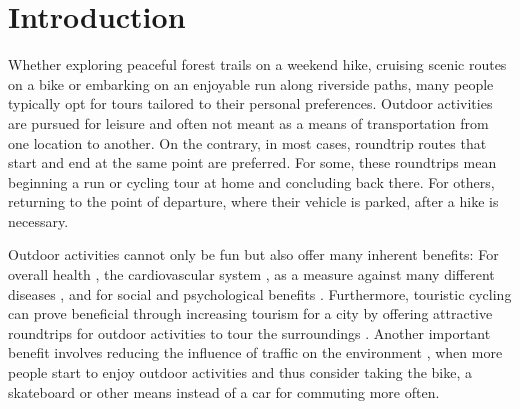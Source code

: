 \chapter{Introduction}
\label{chapter:introduction}



Whether exploring peaceful forest trails on a weekend hike, cruising scenic routes on a bike or embarking on an enjoyable run along riverside paths, many people typically opt for tours tailored to their personal preferences.
Outdoor activities are pursued for leisure and often not meant as a means of transportation from one location to another.
On the contrary, in most cases, roundtrip routes that start and end at the same point are preferred.
For some, these roundtrips mean beginning a run or cycling tour at home and concluding back there. 
For others, returning to the point of departure, where their vehicle is parked, after a hike is necessary.



%

Outdoor activities cannot only be fun but also offer many inherent benefits: 
For overall health \cite{oja_health_2011, ruegsegger_health_2018, vina_exercise_2012}, the cardiovascular system \cite{nystoriak_cardiovascular_2018}, as a measure against many different diseases \cite{oja_health_2011}, and for social \cite{mueller_jogging_2007, obrien_jogging_2007, wankel_psychological_1990} and psychological benefits \cite{biddle_psychological_1993, cekin_psychological_2015, szabo_psychological_2013, wankel_psychological_1990}. 
Furthermore, touristic cycling can prove beneficial through increasing tourism for a city by offering attractive roundtrips for outdoor activities to tour the surroundings \cite{blondiau_economic_2016}.
Another important benefit involves reducing the influence of traffic on the environment \cite{gorobets_development_2016}, when more people start to enjoy outdoor activities and thus consider taking the bike, a skateboard or other means instead of a car for commuting more often.



